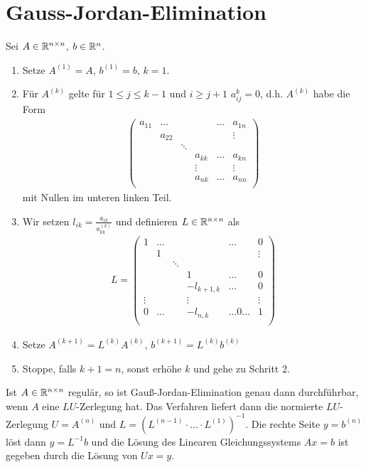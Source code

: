 \documentclass{report}
\begin{document}
 \section{Gauss-Jordan-Elimination}
 	\begin{definition}
 		Sei $A \in \mathbb{R}^{n \times n}$, $b \in \mathbb{R}^n$.
 		\begin{enumerate}
 			\item Setze $A^{(1)} = A$, $b^{(1)} = b$, $k = 1$.
 			\item Für $A^{(k)}$ gelte für $1 \leq j \leq k -1$ und $i \geq j + 1$ $a_{ij}^k = 0$, d.h. $A^{(k)}$ habe die Form
 			\begin{align*}
 				\begin{pmatrix}
 					a_{11}&\hdots&&&\hdots&a_{1n}\\
 					&a_{22}&&&&\vdots\\
 					&&\ddots\\
 					&&&a_{kk} & \hdots & a_{kn}\\
 					&&&\vdots & &\vdots\\
 					&&&a_{nk} & \hdots & a_{nn}\\
 				\end{pmatrix}
 			\end{align*}
 			mit Nullen im unteren linken Teil.
 			\item Wir setzen $\displaystyle l_{ik} = \frac{a_{ik}}{a_{kk}^{(k)}}$ und definieren $L \in \mathbb{R}^{n \times n}$ als
 			\begin{align*}
 				L =
 				\begin{pmatrix}
 					1&\hdots&&&\hdots&0\\
 					&1&&&&\vdots\\
 					&&\ddots\\
 					&&&1 & \hdots & 0\\
 					&&&-l_{k+1, k} & \hdots & 0\\
 					\vdots&&&\vdots & &\vdots\\
 					0&\hdots&&-l_{n,k} & \hdots 0 \hdots& 1\\
 				\end{pmatrix}
 			\end{align*}
 			\item Setze $A^{(k+1)} = L^{(k)}A^{(k)}$, $b^{(k+1)} = L^{(k)}b^{(k)}$
 			\item Stoppe, falls $k + 1 = n$, sonst erhöhe $k$ und gehe zu Schritt 2.
 		\end{enumerate}
 	\end{definition}
 	\begin{theorem}
 		Ist $A \in \mathbb{R}^{n \times n}$ regulär, so ist Gauß-Jordan-Elimination genau dann durchführbar, wenn $A$ eine $LU$-Zerlegung hat. Das Verfahren liefert dann die normierte $LU$-Zerlegung $U = A^{(n)}$ und $L = (L^{(n-1)} \cdot \hdots \cdot L^{(1)})^{-1}$. Die rechte Seite $y = b^{(n)}$ löst dann $y = L^{-1}b$ und die Lösung des Linearen Gleichungssystems $Ax = b$ ist gegeben durch die Lösung von $Ux = y$.
 	\end{theorem}
\end{document}
